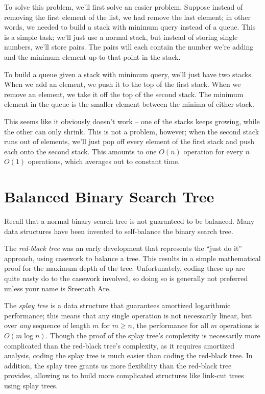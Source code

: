 To solve this problem, we'll first solve an easier problem. Suppose instead of removing the first element of the list, we had remove the last element; in other words, we needed to build a stack with minimum query instead of a queue. This is a simple task; we'll just use a normal stack, but instead of storing single numbers, we'll store pairs. The pairs will each contain the number we're adding and the minimum element up to that point in the stack.

To build a queue given a stack with minimum query, we'll just have two stacks. When we add an element, we push it to the top of the first stack. When we remove an element, we take it off the top of the second stack. The minimum element in the queue is the smaller element between the minima of either stack.

This seems like it obviously doesn't work -- one of the stacks keeps growing, while the other can only shrink. This is not a problem, however; when the second stack runs out of elements, we'll just pop off every element of the first stack and push each onto the second stack. This amounts to one $O(n)$ operation for every $n$ $O(1)$ operations, which averages out to constant time.

\section{Balanced Binary Search Tree}

Recall that a normal binary search tree is not guaranteed to be balanced. Many data structures have been invented to self-balance the binary search tree.

The \textit{red-black tree} was an early development that represents the ``just do it'' approach, using casework to balance a tree. This results in a simple mathematical proof for the maximum depth of the tree. Unfortunately, coding these up are quite nasty do to the casework involved, so doing so is generally not preferred unless your name is Sreenath Are.

The \textit{splay tree} is a data structure that guarantees amortized logarithmic performance; this means that any single operation is not necessarily linear, but over \textit{any} sequence of length $m$ for $m \ge n$, the performance for all $m$ operations is $O(m \log{n})$. Though the proof of the splay tree's complexity is necessarily more complicated than the red-black tree's complexity, as it requires amortized analysis, coding the splay tree is much easier than coding the red-black tree. In addition, the splay tree grants us more flexibility than the red-black tree provides, allowing us to build more complicated structures like link-cut trees using splay trees.

